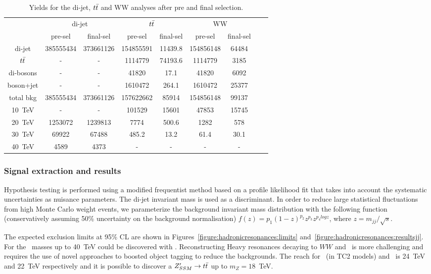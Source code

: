 \begin{table}[htbp]
   \centering
\begin{tabular}{|c|c|c|c|c|c|c|c|c|}
  \hline
  \hline
  & \multicolumn{2}{c|}{di-jet}  & \multicolumn{2}{c|}{$t\bar{t}$} & \multicolumn{2}{c|}{WW} \\
  \cline{2-7}

 & pre-sel & final-sel  & pre-sel & final-sel & pre-sel & final-sel\\
  \hline
  di-jet & 385555434 &  373661126 &  154855591 & 11439.8&  154856148 & 64484\\
  $t\bar{t}$ & - & - & 1114779 & 74193.6 &  1114779 & 3185\\
  di-bosons & - & - &  41820 &  17.1 &  41820 & 6092\\
  boson+jet & - & - & 1610472 & 264.1&  1610472 & 25377\\
  \hline
  total bkg  &  385555434& 373661126& 157622662 & 85914 & 154856148 & 99137\\
  \hline
  10~TeV &  - & - &  101529 & 15601 &  47853 & 15745\\
  20~TeV &   1253072 &  1239813& 7774 & 500.6 & 1282 & 578\\
  30~TeV &  69922 &  67488 & 485.2 & 13.2 &  61.4 & 30.1 \\
  40~TeV &  4589 &  4373 & - & - & - & -\\
  \hline
  \hline
\end{tabular}
  \caption{Yields for the di-jet, $t\bar{t}$ and WW analyses after pre and final selection.}
  \label{tab:hadronicresonances:yields}
\end{table}

\subsubsection{Signal extraction and results}
Hypothesis testing is performed using a modified frequentist method based on a profile likelihood fit that takes into account the systematic uncertainties as nuisance parameters. The di-jet invariant mass is used as a discriminant. In order to reduce large statistical fluctuations from high Monte Carlo weight events, we parameterize the background invariant mass distribution with the following function (conservatively assuming 50\% uncertainty on the background normalisation) $f(z)=p_1(1-z)^{p_2}z^{p_3}z^{p_{4}logz}$, where $z=m_{jj}/\sqrt{s}$.

The expected exclusion limits at 95\% CL are shown in Figures~\ref{figure:hadronicresonances:limits} and~\ref{figure:hadronicresonances:resultsjj}. For the \qjj\ masses up to 40~TeV could be discovered with \intlumifcc. Reconstructing Heavy resonances decaying to $WW$ and \ttbar\ is more challenging and requires the use of novel approaches to boosted object tagging to reduce the backgrounds. The reach for \zptt\ (in TC2 models) and \rsg\ is 24~TeV and 22~TeV respectively and it is possible to discover a $Z^{\prime}_{SSM} \rightarrow t\bar{t}$ up to $m_{Z}=18$~TeV.

